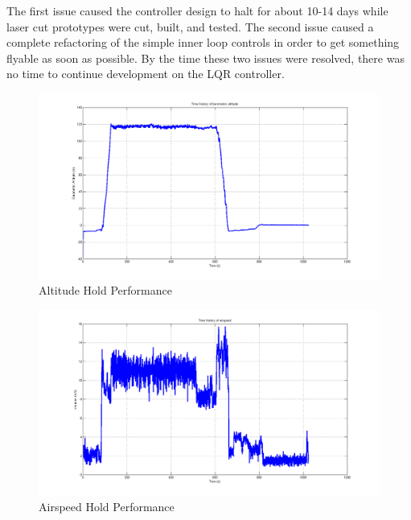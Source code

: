 \documentclass[11pt]{article}
\begin{document}
The first issue caused the controller design to halt for about 10-14 days while laser cut prototypes were cut, built, and tested. The second issue caused a complete refactoring of the simple inner loop controls in order to get something flyable as soon as possible. By the time these two issues were resolved, there was no time to continue development on the LQR controller.

\begin{figure}[h!]
\centering
\includegraphics[width=\textwidth]{./Figures/AltitudeHoldPerformance}
\caption{Altitude Hold Performance}
\label{fig:AltitudeHoldPerformance}
\end{figure}

\begin{figure}[h!]
\centering
\includegraphics[width=\textwidth]{./Figures/AirspeedHoldPerformance}
\caption{Airspeed Hold Performance}
\label{fig:AirspeedHoldPerformance}
\end{figure}
\end{document}
